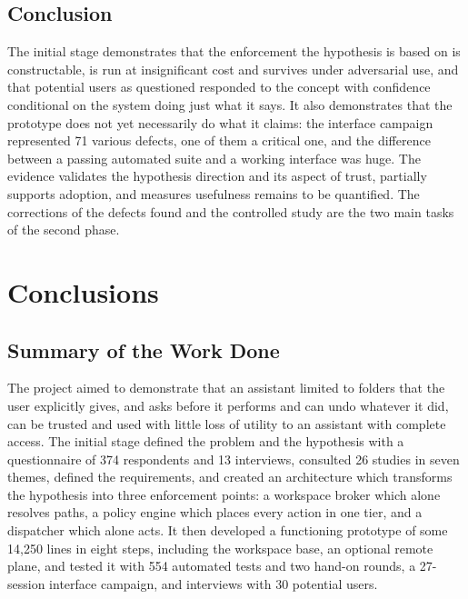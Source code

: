 \documentclass{FastFyp}
\begin{document}
\section{Conclusion}
The initial stage demonstrates that the enforcement the hypothesis is based on is constructable, is run at insignificant cost and survives under adversarial use, and that potential users as questioned responded to the concept with confidence conditional on the system doing just what it says. It also demonstrates that the prototype does not yet necessarily do what it claims: the interface campaign represented 71 various defects, one of them a critical one, and the difference between a passing automated suite and a working interface was huge. The evidence validates the hypothesis direction and its aspect of trust, partially supports adoption, and measures usefulness remains to be quantified. The corrections of the defects found and the controlled study are the two main tasks of the second phase.

\chapter{Conclusions}
\section{Summary of the Work Done}
The project aimed to demonstrate that an assistant limited to folders that the user explicitly gives, and asks before it performs and can undo whatever it did, can be trusted and used with little loss of utility to an assistant with complete access. The initial stage defined the problem and the hypothesis with a questionnaire of 374 respondents and 13 interviews, consulted 26 studies in seven themes, defined the requirements, and created an architecture which transforms the hypothesis into three enforcement points: a workspace broker which alone resolves paths, a policy engine which places every action in one tier, and a dispatcher which alone acts. It then developed a functioning prototype of some 14,250 lines in eight steps, including the workspace base, an optional remote plane, and tested it with 554 automated tests and two hand-on rounds, a 27-session interface campaign, and interviews with 30 potential users.
\end{document}
